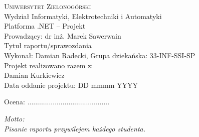 \documentclass[12pt,a4paper]{article}
\begin{document}
\pagestyle{empty}

%
%

\begin{center}
\textsc{\Huge{Uniwersytet Zielonogórski}}\\
\LARGE{Wydział Informatyki, Elektrotechniki i Automatyki}\\
\vspace{0.5cm}
\Large{Platforma .NET -- Projekt}\\
Prowadzący: dr inż. Marek Sawerwain\\ \vspace{1cm}
\LARGE{Tytuł raportu/sprawozdania}\\
\vspace{0.5cm} 
\Large{Wykonał: Damian Radecki, Grupa dziekańska: 33-INF-SSI-SP} \\
\Large{Projekt realizowano razem z: \\ Damian Kurkiewicz}\\
\Large{Data oddanie projektu: DD mmmm YYYY}
\vspace{1cm}
\begin{flushleft}
	Ocena: ..........................................
\end{flushleft}
\vspace{1cm}
\end{center}



%
%

\begin{multicols}{2}
	\footnotesize
	\tableofcontents
\end{multicols}


%
%

\begin{multicols}{2}
	\footnotesize
	\lstlistoflistings
\end{multicols}




\noindent\makebox[\linewidth]{\rule{0.6\paperwidth}{0.4pt}}

\begin{flushleft}
	\emph{Motto:}\\
	\textit{Pisanie raportu przywilejem każdego studenta.}
\end{flushleft}

\end{document}
